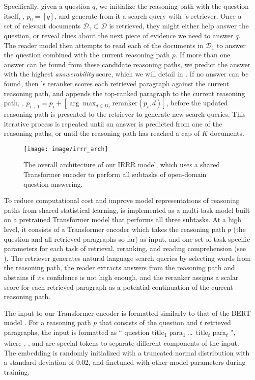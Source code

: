 Specifically, given a question $q$, we initialize the reasoning path with the question itself, \ie, $p_0 = [q]$, and generate from it a search query with \irrr{}'s retriever.
Once a set of relevant documents $\mathcal{D}_1 \subset \mathcal{D}$ is retrieved, they might either help answer the question, or reveal clues about the next piece of evidence we need to answer $q$.
The reader model then attempts to read each of the documents in $\mathcal{D}_1$ to answer the question combined with the current reasoning path $p$.
If more than one answer can be found from these candidate reasoning paths, we predict the answer with the highest \emph{answerability} score, which we will detail in .
If no answer can be found, then \irrr{}'s reranker scores each retrieved paragraph against the current reasoning path, and appends the top-ranked paragraph to the current reasoning path, \ie, $p_{i+1} = p_i + [\arg\max_{d \in D_1} \mathrm{reranker}(p_i, d)]$, before the updated reasoning path is presented to the retriever to generate new search queries.
This iterative process is repeated until an answer is predicted from one of the reasoning paths, or until the reasoning path has reached a cap of $K$ documents.%

\begin{figure}
\centering
\texttt{[image: image/irrr\_arch]} 
\caption{The overall architecture of our IRRR model, which uses a shared Transformer encoder to perform all subtasks of open-domain question answering. }\label{fig:irrr_arch}
\end{figure}

To reduce computational cost and improve model representations of reasoning paths from shared statistical learning, %
\irrr{} is implemented as a multi-task model built on a pretrained Transformer model that performs all three subtasks.
At a high level, it consists of a Transformer encoder \citep{vaswani2017attention} which takes the reasoning path $p$ (the question and all retrieved paragraphs so far) as input, and one set of task-specific parameters for each task of retrieval, reranking, and reading comprehension (see ).
The retriever generates natural language search queries by selecting words from the reasoning path, the reader extracts answers from the reasoning path and abstains if its confidence is not high enough, and the reranker assigns a scalar score for each retrieved paragraph as a potential continuation of the current reasoning path.

The input to our Transformer encoder is formatted similarly to that of the BERT model \citep{devlin2019bert}. 
For a reasoning path $p$ that consists of the question and $t$ retrieved paragraphs, the input is formatted as ``\clstoken{} question \septoken{} title\textsubscript{1} \conttoken{} para\textsubscript{1}%
\septoken{} \ldots\ title\textsubscript{$t$} \conttoken{} para\textsubscript{$t$} \septoken{}'', where \clstoken{}, \septoken{}, and \conttoken{} are special tokens to separate different components of the input.
The \conttoken{} embedding is randomly initialized with a truncated normal distribution with a standard deviation of 0.02, and finetuned with other model parameters during training.


